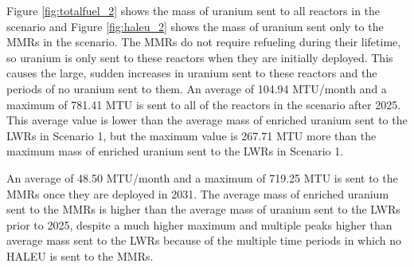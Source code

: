 Figure \ref{fig:totalfuel_2} shows the mass of uranium sent to all 
reactors in the scenario and Figure \ref{fig:haleu_2} shows the mass 
of uranium sent only to the \glspl{MMR} in the scenario. The \glspl{MMR} 
do not require refueling during their lifetime, so uranium is only 
sent to these reactors when they are initially deployed. This causes the 
large, sudden increases in uranium sent to these reactors and the periods of 
no uranium sent to them. An average of 104.94 MTU/month and a maximum 
of 781.41 MTU is sent to all of the reactors in the scenario after 2025. 
This average value is lower than the average mass of enriched uranium 
sent to the \glspl{LWR} in Scenario 1, but the maximum value is 267.71 MTU 
more than the maximum mass of enriched uranium sent to the \glspl{LWR} in 
Scenario 1. 

An average of 48.50 MTU/month and a maximum of 719.25 
MTU is sent to the \glspl{MMR} once they are deployed in 2031. The average mass of enriched uranium sent to the 
\glspl{MMR} is higher than the average mass of uranium sent to the \glspl{LWR}
prior to 2025, despite a much higher maximum and multiple peaks higher than
average mass sent to the \glspl{LWR} because of the multiple time periods in 
which no \gls{HALEU} is sent to the \glspl{MMR}.  

